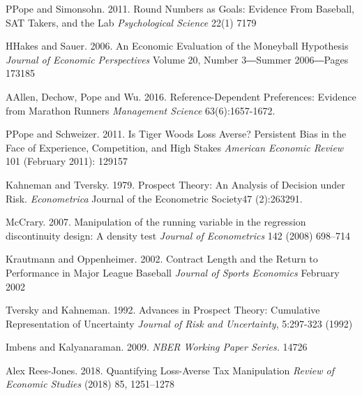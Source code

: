 \documentclass[dvipdfmx, 12pt]{article}
\begin{document}
\begin{thebibliography}{99}
  \bibitem PPope and Simonsohn. 2011.
  Round Numbers as Goals: Evidence From Baseball, SAT Takers, and the Lab
  \textit{Psychological Science} 22(1) 7179

  \bibitem HHakes and Sauer. 2006.
  An Economic Evaluation of the Moneyball Hypothesis
  \textit{Journal of Economic Perspectives} Volume 20, Number 3―Summer 2006―Pages 173185

  \bibitem AAllen, Dechow, Pope and Wu. 2016.
  Reference-Dependent Preferences: Evidence from Marathon Runners \textit{Management Science} 63(6):1657-1672.

  \bibitem PPope and Schweizer. 2011.
  Is Tiger Woods Loss Averse? Persistent Bias in the Face of Experience, Competition, and High Stakes
  \textit{American Economic Review} 101 (February 2011): 129157

  \bibitem{}Kahneman and Tversky. 1979.
  Prospect Theory: An Analysis of Decision under Risk.
  \textit{Econometrica}
  Journal of the Econometric Society47 (2):263291.

  \bibitem{}McCrary. 2007.
  Manipulation of the running variable in the regression discontinuity design: A density test
  \textit{Journal of Econometrics} 142 (2008) 698–714

  \bibitem{}Krautmann and Oppenheimer. 2002.
  Contract Length and the Return to Performance in Major League Baseball
  \textit{Journal of Sports Economics} February 2002

  \bibitem{}Tversky and Kahneman. 1992.
  Advances in Prospect Theory: Cumulative Representation of Uncertainty
  \textit{Journal of Risk and Uncertainty}, 5:297-323 (1992)

  \bibitem{}Imbens and Kalyanaraman. 2009.
  \textit{NBER Working Paper Series.} 14726

  \bibitem{}Alex Rees-Jones. 2018.
  Quantifying Loss-Averse Tax Manipulation
  \textit{Review of Economic Studies} (2018) 85, 1251–1278
\end{thebibliography}
\end{document}
